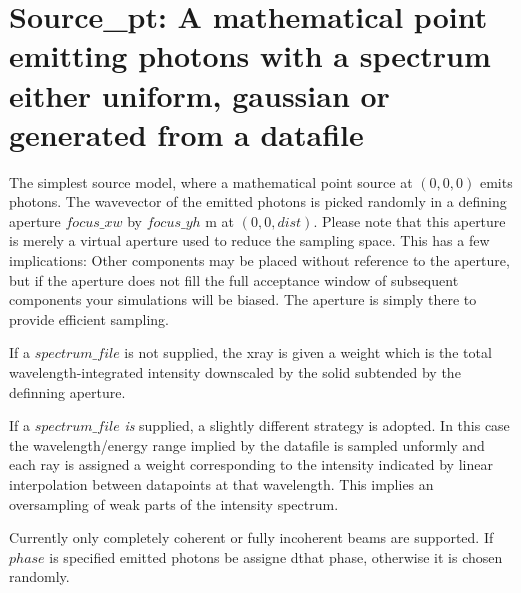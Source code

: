 \section{Source\_pt: A mathematical point emitting photons with a spectrum either uniform, gaussian or generated from a datafile}
\label{source-pt}

The simplest source model, where a mathematical point source at $(0,0,0)$ emits photons. The wavevector of the emitted photons
is picked randomly in a defining aperture $focus\_xw$ by $focus\_yh$ m at $(0,0,dist)$. 
Please note that this aperture is merely a
virtual aperture used to reduce the sampling space. This has a few
implications: Other components may be placed without reference to the aperture,
but if the aperture does not fill the full acceptance window of subsequent
components your simulations will be biased. The aperture is simply there to provide efficient sampling.

If a $spectrum\_file$ is not supplied, the xray
is given a weight which is the total wavelength-integrated intensity downscaled
by the
solid subtended by the definning aperture.

If a $spectrum\_file$ \emph{is} supplied, a slightly different strategy is adopted. In this case the
wavelength/energy range implied by the datafile is sampled unformly and each ray is assigned
a weight corresponding to the intensity indicated by linear interpolation between datapoints
at that wavelength. This implies an oversampling of weak parts of the intensity spectrum.

Currently only completely coherent or fully incoherent beams are supported. If
$phase$ is specified emitted photons be assigne dthat phase, otherwise it is
chosen randomly.

